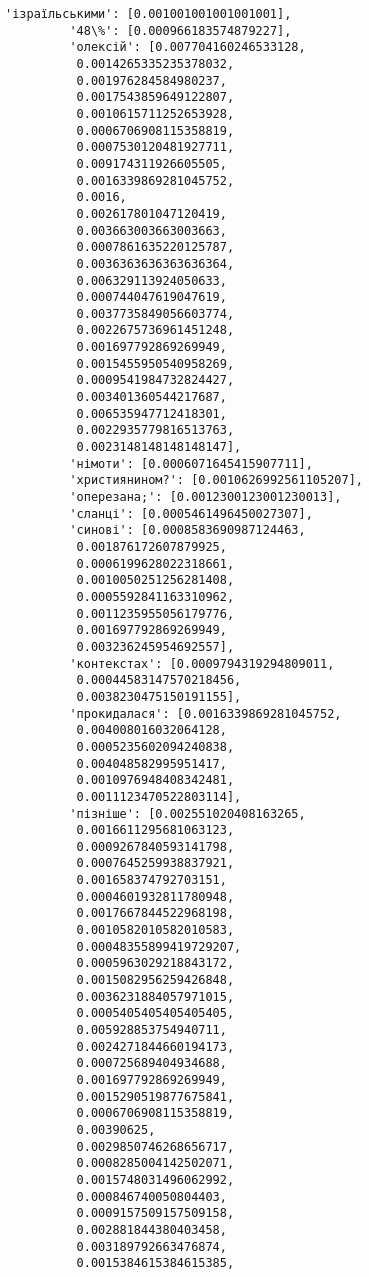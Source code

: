 \documentclass[11pt]{article}
\begin{document}
\begin{Verbatim}[commandchars=\\\{\}]
         'ізраїльськими': [0.001001001001001001],
         '48\%': [0.000966183574879227],
         'олексій': [0.007704160246533128,
          0.0014265335235378032,
          0.001976284584980237,
          0.0017543859649122807,
          0.0010615711252653928,
          0.0006706908115358819,
          0.0007530120481927711,
          0.009174311926605505,
          0.0016339869281045752,
          0.0016,
          0.002617801047120419,
          0.003663003663003663,
          0.0007861635220125787,
          0.0036363636363636364,
          0.006329113924050633,
          0.000744047619047619,
          0.0037735849056603774,
          0.0022675736961451248,
          0.001697792869269949,
          0.0015455950540958269,
          0.0009541984732824427,
          0.003401360544217687,
          0.006535947712418301,
          0.0022935779816513763,
          0.0023148148148148147],
         'німоти': [0.0006071645415907711],
         'християнином?': [0.0010626992561105207],
         'оперезана;': [0.0012300123001230013],
         'сланці': [0.0005461496450027307],
         'синові': [0.0008583690987124463,
          0.001876172607879925,
          0.0006199628022318661,
          0.0010050251256281408,
          0.0005592841163310962,
          0.0011235955056179776,
          0.001697792869269949,
          0.003236245954692557],
         'контекстах': [0.0009794319294809011,
          0.00044583147570218456,
          0.0038230475150191155],
         'прокидалася': [0.0016339869281045752,
          0.004008016032064128,
          0.0005235602094240838,
          0.004048582995951417,
          0.0010976948408342481,
          0.0011123470522803114],
         'пізніше': [0.002551020408163265,
          0.0016611295681063123,
          0.0009267840593141798,
          0.0007645259938837921,
          0.001658374792703151,
          0.0004601932811780948,
          0.0017667844522968198,
          0.0010582010582010583,
          0.00048355899419729207,
          0.0005963029218843172,
          0.0015082956259426848,
          0.0036231884057971015,
          0.0005405405405405405,
          0.005928853754940711,
          0.0024271844660194173,
          0.000725689404934688,
          0.001697792869269949,
          0.0015290519877675841,
          0.0006706908115358819,
          0.00390625,
          0.0029850746268656717,
          0.0008285004142502071,
          0.0015748031496062992,
          0.000846740050804403,
          0.0009157509157509158,
          0.002881844380403458,
          0.003189792663476874,
          0.0015384615384615385,

\end{Verbatim}
\end{document}
